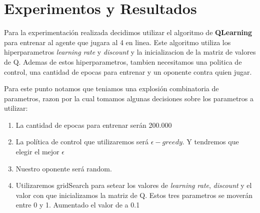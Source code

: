 \section{Experimentos y Resultados}
%
%
%
%
%

Para la experimentación realizada decidimos utilizar el algoritmo de \textbf{QLearning} para entrenar al agente que jugara
al 4 en linea. Este algoritmo utiliza los hiperparametros \textit{learning rate} y \textit{discount} y la inicializacion
 de la matriz de valores de Q. 
 Ademas de estos hiperparametros, tambien necesitamos una politica de control, una cantidad
  de epocas para entrenar y un oponente contra quien jugar. 

Para este punto notamos que teniamos una explosión combinatoria de parametros, razon por la cual tomamos algunas decisiones
sobre los parametros a utilizar:

\begin{enumerate}
\item La cantidad de epocas para entrenar serán 200.000
\item La política de control que utilizaremos será \textbf{$\epsilon-greedy$}. Y tendremos que elegir el mejor $\epsilon$
\item Nuestro oponente será random.
\item Utilizaremos gridSearch para setear los valores de \textit{learning rate},  \textit{discount} y el valor con que
inicializamos la matriz de Q. Estos tres parametros se moverán entre 0 y 1. Aumentado el valor de a 0.1
\end{enumerate}


